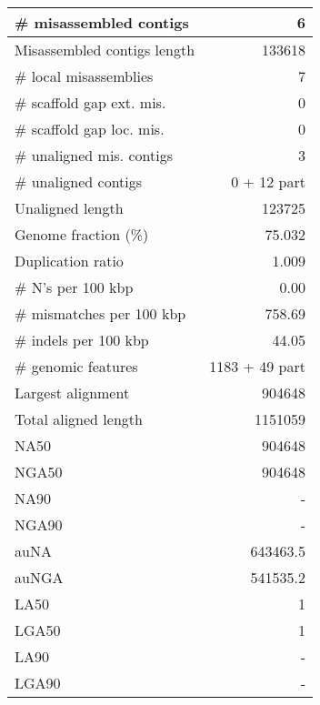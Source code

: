 \documentclass[12pt,a4paper]{article}
\begin{document}
\begin{table}[ht]
\begin{center}
\begin{tabular}{|l*{1}{|r}|}
\# misassembled contigs & 6 \\ \hline
Misassembled contigs length & 133618 \\ \hline
\# local misassemblies & 7 \\ \hline
\# scaffold gap ext. mis. & 0 \\ \hline
\# scaffold gap loc. mis. & 0 \\ \hline
\# unaligned mis. contigs & 3 \\ \hline
\# unaligned contigs & 0 + 12 part \\ \hline
Unaligned length & 123725 \\ \hline
Genome fraction (\%) & 75.032 \\ \hline
Duplication ratio & 1.009 \\ \hline
\# N's per 100 kbp & 0.00 \\ \hline
\# mismatches per 100 kbp & 758.69 \\ \hline
\# indels per 100 kbp & 44.05 \\ \hline
\# genomic features & 1183 + 49 part \\ \hline
Largest alignment & 904648 \\ \hline
Total aligned length & 1151059 \\ \hline
NA50 & 904648 \\ \hline
NGA50 & 904648 \\ \hline
NA90 & - \\ \hline
NGA90 & - \\ \hline
auNA & 643463.5 \\ \hline
auNGA & 541535.2 \\ \hline
LA50 & 1 \\ \hline
LGA50 & 1 \\ \hline
LA90 & - \\ \hline
LGA90 & - \\ \hline
\end{tabular}
\end{center}
\end{table}
\end{document}
